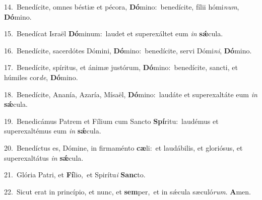 {\numbfont\textcolor{\numbcolor}{14.}}~Benedícite, omnes béstiæ et pécora, \textbf{Dó}\-mino:~\star benedícite, fílii hómi\-\textit{num}\-, \textbf{Dó}\-mino.\par
{\numbfont\textcolor{\numbcolor}{15.}}~Benedícat Israël \textbf{Dó}\-minum:~\star laudet et superexáltet eum \textit{in} \textbf{sǽ}\-cula.\par
{\numbfont\textcolor{\numbcolor}{16.}}~Benedícite, sacerdótes Dómini, \textbf{Dó}\-mino:~\star benedícite, servi Dómi\-\textit{ni}\-, \textbf{Dó}\-mino.\par
{\numbfont\textcolor{\numbcolor}{17.}}~Benedícite, spíritus, et ánimæ justórum, \textbf{Dó}\-mino:~\star benedícite, sancti, et húmiles cor\-\textit{de}\-, \textbf{Dó}\-mino.\par
{\numbfont\textcolor{\numbcolor}{18.}}~Benedícite, Ananía, Azaría, Mísaël, \textbf{Dó}\-mino:~\star laudáte et superexaltáte eum \textit{in} \textbf{sǽ}\-cula.\par
{\numbfont\textcolor{\numbcolor}{19.}}~Benedicámus Patrem et Fílium cum Sancto \textbf{Spí}\-ritu:~\star laudémus et superexaltémus eum \textit{in} \textbf{sǽ}\-cula.\par
{\numbfont\textcolor{\numbcolor}{20.}}~Benedíctus es, Dómine, in firmaménto \textbf{cæ}\-li:~\star et laudábilis, et gloriósus, et superexaltátus \textit{in} \textbf{sǽ}\-cula.\par
{\numbfont\textcolor{\numbcolor}{21.}}~Glória Patri, et \textbf{Fí}\-lio,~\star et Spirítu\textit{i} \textbf{Sanc}\-to.\par
{\numbfont\textcolor{\numbcolor}{22.}}~Sicut erat in princípio, et nunc, et \textbf{sem}\-per,~\star et in sǽcula sæculó\-\textit{rum}\-. \textbf{A}\-men.\par
